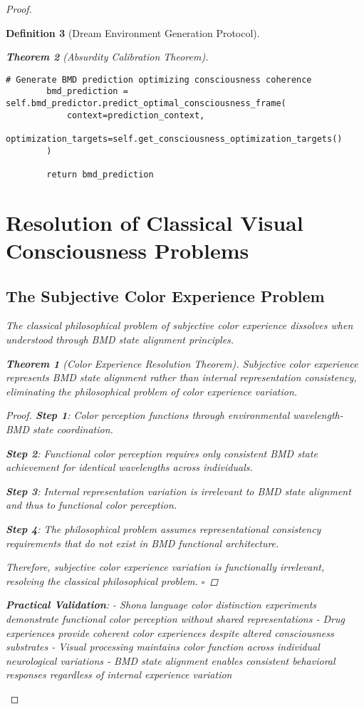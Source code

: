 \documentclass[12pt,a4paper]{article}
\newtheorem{theorem}{Theorem}[section]
\newtheorem{definition}[theorem]{Definition}
\begin{document}
\begin{proof}
\begin{definition}[Dream Environment Generation Protocol]
\begin{theorem}[Absurdity Calibration Theorem]
\begin{lstlisting}[style=pythonstyle, caption=Visual Memory BMD Integration]
        # Generate BMD prediction optimizing consciousness coherence
        bmd_prediction = self.bmd_predictor.predict_optimal_consciousness_frame(
            context=prediction_context,
            optimization_targets=self.get_consciousness_optimization_targets()
        )
        
        return bmd_prediction
\end{lstlisting}

\section{Resolution of Classical Visual Consciousness Problems}

\subsection{The Subjective Color Experience Problem}

The classical philosophical problem of subjective color experience dissolves when understood through BMD state alignment principles.

\begin{theorem}[Color Experience Resolution Theorem]
Subjective color experience represents BMD state alignment rather than internal representation consistency, eliminating the philosophical problem of color experience variation.
\end{theorem}

\begin{proof}
\textbf{Step 1}: Color perception functions through environmental wavelength-BMD state coordination.

\textbf{Step 2}: Functional color perception requires only consistent BMD state achievement for identical wavelengths across individuals.

\textbf{Step 3}: Internal representation variation is irrelevant to BMD state alignment and thus to functional color perception.

\textbf{Step 4}: The philosophical problem assumes representational consistency requirements that do not exist in BMD functional architecture.

Therefore, subjective color experience variation is functionally irrelevant, resolving the classical philosophical problem. $\square$
\end{proof}

\textbf{Practical Validation}:
- Shona language color distinction experiments demonstrate functional color perception without shared representations
- Drug experiences provide coherent color experiences despite altered consciousness substrates
- Visual processing maintains color function across individual neurological variations
- BMD state alignment enables consistent behavioral responses regardless of internal experience variation


\end{theorem}
\end{definition}
\end{proof}
\end{document}
